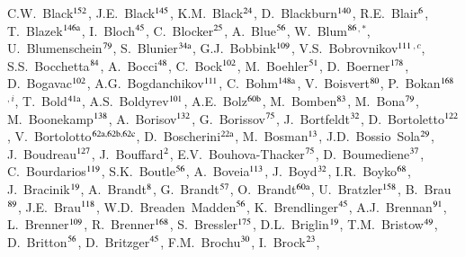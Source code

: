 \begin{flushleft}
C.W.~Black$^\textrm{\scriptsize 152}$,
J.E.~Black$^\textrm{\scriptsize 145}$,
K.M.~Black$^\textrm{\scriptsize 24}$,
D.~Blackburn$^\textrm{\scriptsize 140}$,
R.E.~Blair$^\textrm{\scriptsize 6}$,
T.~Blazek$^\textrm{\scriptsize 146a}$,
I.~Bloch$^\textrm{\scriptsize 45}$,
C.~Blocker$^\textrm{\scriptsize 25}$,
A.~Blue$^\textrm{\scriptsize 56}$,
W.~Blum$^\textrm{\scriptsize 86}$$^{,*}$,
U.~Blumenschein$^\textrm{\scriptsize 79}$,
S.~Blunier$^\textrm{\scriptsize 34a}$,
G.J.~Bobbink$^\textrm{\scriptsize 109}$,
V.S.~Bobrovnikov$^\textrm{\scriptsize 111}$$^{,c}$,
S.S.~Bocchetta$^\textrm{\scriptsize 84}$,
A.~Bocci$^\textrm{\scriptsize 48}$,
C.~Bock$^\textrm{\scriptsize 102}$,
M.~Boehler$^\textrm{\scriptsize 51}$,
D.~Boerner$^\textrm{\scriptsize 178}$,
D.~Bogavac$^\textrm{\scriptsize 102}$,
A.G.~Bogdanchikov$^\textrm{\scriptsize 111}$,
C.~Bohm$^\textrm{\scriptsize 148a}$,
V.~Boisvert$^\textrm{\scriptsize 80}$,
P.~Bokan$^\textrm{\scriptsize 168}$$^{,i}$,
T.~Bold$^\textrm{\scriptsize 41a}$,
A.S.~Boldyrev$^\textrm{\scriptsize 101}$,
A.E.~Bolz$^\textrm{\scriptsize 60b}$,
M.~Bomben$^\textrm{\scriptsize 83}$,
M.~Bona$^\textrm{\scriptsize 79}$,
M.~Boonekamp$^\textrm{\scriptsize 138}$,
A.~Borisov$^\textrm{\scriptsize 132}$,
G.~Borissov$^\textrm{\scriptsize 75}$,
J.~Bortfeldt$^\textrm{\scriptsize 32}$,
D.~Bortoletto$^\textrm{\scriptsize 122}$,
V.~Bortolotto$^\textrm{\scriptsize 62a,62b,62c}$,
D.~Boscherini$^\textrm{\scriptsize 22a}$,
M.~Bosman$^\textrm{\scriptsize 13}$,
J.D.~Bossio~Sola$^\textrm{\scriptsize 29}$,
J.~Boudreau$^\textrm{\scriptsize 127}$,
J.~Bouffard$^\textrm{\scriptsize 2}$,
E.V.~Bouhova-Thacker$^\textrm{\scriptsize 75}$,
D.~Boumediene$^\textrm{\scriptsize 37}$,
C.~Bourdarios$^\textrm{\scriptsize 119}$,
S.K.~Boutle$^\textrm{\scriptsize 56}$,
A.~Boveia$^\textrm{\scriptsize 113}$,
J.~Boyd$^\textrm{\scriptsize 32}$,
I.R.~Boyko$^\textrm{\scriptsize 68}$,
J.~Bracinik$^\textrm{\scriptsize 19}$,
A.~Brandt$^\textrm{\scriptsize 8}$,
G.~Brandt$^\textrm{\scriptsize 57}$,
O.~Brandt$^\textrm{\scriptsize 60a}$,
U.~Bratzler$^\textrm{\scriptsize 158}$,
B.~Brau$^\textrm{\scriptsize 89}$,
J.E.~Brau$^\textrm{\scriptsize 118}$,
W.D.~Breaden~Madden$^\textrm{\scriptsize 56}$,
K.~Brendlinger$^\textrm{\scriptsize 45}$,
A.J.~Brennan$^\textrm{\scriptsize 91}$,
L.~Brenner$^\textrm{\scriptsize 109}$,
R.~Brenner$^\textrm{\scriptsize 168}$,
S.~Bressler$^\textrm{\scriptsize 175}$,
D.L.~Briglin$^\textrm{\scriptsize 19}$,
T.M.~Bristow$^\textrm{\scriptsize 49}$,
D.~Britton$^\textrm{\scriptsize 56}$,
D.~Britzger$^\textrm{\scriptsize 45}$,
F.M.~Brochu$^\textrm{\scriptsize 30}$,
I.~Brock$^\textrm{\scriptsize 23}$,
$$
\end{flushleft}
